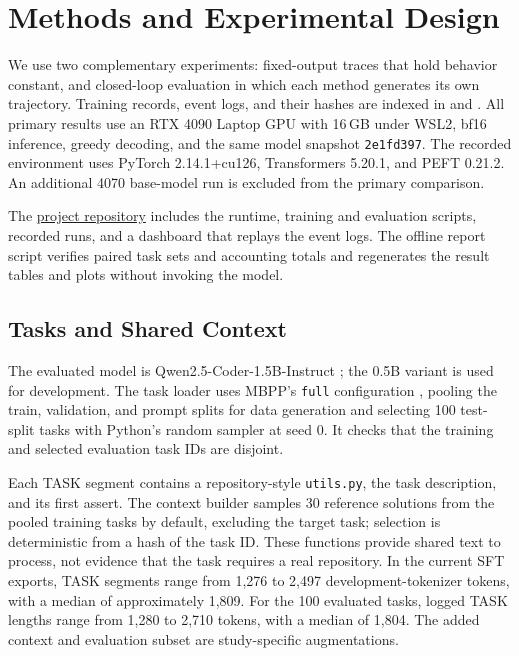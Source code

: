 \documentclass[10pt,twocolumn,letterpaper]{article}
\begin{document}
\section{Methods and Experimental Design}
\label{sec:methods}
We use two complementary experiments: fixed-output traces that hold behavior
constant, and closed-loop evaluation in which each method generates its own
trajectory. Training records, event logs, and their hashes are indexed in
 and .
All primary results use an RTX 4090 Laptop GPU with 16\,GB under WSL2, bf16
inference, greedy decoding, and the same model snapshot
\texttt{2e1fd397}. The recorded environment uses PyTorch 2.14.1+cu126,
Transformers 5.20.1, and PEFT 0.21.2. An additional 4070 base-model run is
excluded from the primary comparison.

The \href{https://github.com/Yinghao-Guan/ai-hackathon-26}{project repository}
includes the runtime, training and evaluation scripts, recorded runs, and a
dashboard that replays the event logs. The offline report script verifies
paired task sets and accounting totals and regenerates the result tables
and plots without invoking the model.

\subsection{Tasks and Shared Context}
The evaluated model is Qwen2.5-Coder-1.5B-Instruct
\cite{hui2024qwen25coder}; the 0.5B variant is used for development. The task
loader uses MBPP's \texttt{full} configuration \cite{austin2021mbpp}, pooling
the train, validation, and prompt splits for data generation and selecting
100 test-split tasks with Python's random sampler at seed 0. It checks that
the training and selected evaluation task IDs are disjoint.

Each TASK segment contains a repository-style \texttt{utils.py}, the task
description, and its first assert. The context builder samples 30 reference
solutions from the pooled training tasks by default, excluding the target
task; selection is deterministic from a hash of the task ID. These functions
provide shared text to process, not evidence that the task requires a real
repository. In the current SFT exports, TASK segments range from 1,276 to
2,497 development-tokenizer tokens, with a median of approximately 1,809.
For the 100 evaluated tasks, logged TASK lengths range from 1,280 to 2,710
tokens, with a median of 1,804. The added context and evaluation subset are
study-specific augmentations.
\end{document}
